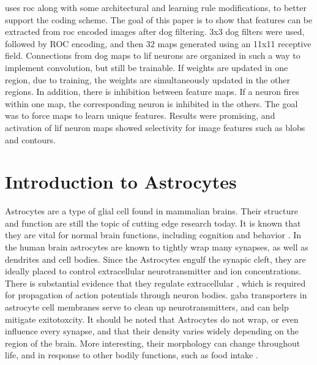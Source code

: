     \parencite{delorme_2001} uses \Gls{roc} along with some architectural and learning rule
    modifications, to better support the coding scheme. The goal of this paper
    is to show that features can be extracted from \Gls{roc} encoded images after \Gls{dog}
    filtering. 3x3 \Gls{dog} filters were used, followed by ROC encoding, and then 32
    maps generated using an 11x11 receptive field. Connections from \Gls{dog} maps to
    \Gls{lif} neurons are organized in such a way to implement convolution, but still
    be trainable. If weights are updated in one region, due to training, the
    weights are simultaneously updated in the other regions. In addition, there
    is inhibition between feature maps. If a neuron fires within one map, the
    corresponding neuron is inhibited in the others. The goal was to force maps
    to learn unique features. Results were promising, and activation of \Gls{lif}
    neuron maps showed selectivity for image features such as blobs and
    contours.
    
    \section{Introduction to Astrocytes}
    Astrocytes are a type of glial cell found in mammalian brains. Their
    structure and function are still the topic of cutting edge research
    today. It is known that they are vital for normal brain functions, including
    cognition and behavior \cite{mederos_2018}. In the human brain astrocytes
    are known to tightly wrap many synapses, as well as dendrites and cell
    bodies. Since the Astrocytes engulf the synapic cleft, they are ideally
    placed to control extracellular neurotransmitter and ion
    concentrations. There is substantial evidence that they regulate
    extracellular \kp, which is required for propagation of action potentials
    through neuron bodies. \Gls{gaba} transporters in astrocyte cell membranes
    serve to clean up neurotransmitters, and can help mitigate exitotoxcity. It
    should be noted that Astrocytes do not wrap, or even influence every
    synapse, and that their density varies widely depending on the region of the
    brain. More interesting, their morphology can change throughout life, and in
    response to other bodily functions, such as food intake \cite{mederos_2018}.


